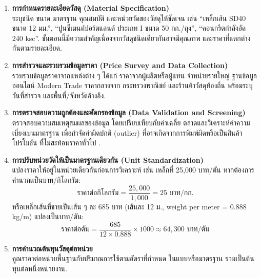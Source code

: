 \begin{enumerate}[leftmargin=2em,itemsep=0.3em]
  \item \textbf{การกำหนดรายละเอียดวัสดุ (Material Specification)}\\
        ระบุชนิด ขนาด มาตรฐาน คุณสมบัติ และหน่วยวัดของวัสดุให้ชัดเจน
        เช่น ``เหล็กเส้น SD40 ขนาด 12 มม.'', ``ปูนซีเมนต์ปอร์ตแลนด์
        ประเภท I ขนาด 50 กก./ถุง'', ``คอนกรีตกำลังอัด 240 ksc''.
        ขั้นตอนนี้มีความสำคัญเนื่องจากวัสดุชนิดเดียวกันอาจมีคุณภาพ
        และราคาที่แตกต่างกันตามรายละเอียด.

  \item \textbf{การสำรวจและรวบรวมข้อมูลราคา (Price Survey and Data Collection)}\\
        รวบรวมข้อมูลราคาจากแหล่งต่าง ๆ ได้แก่ ราคาจากผู้ผลิตหรือผู้แทน
        จำหน่ายรายใหญ่ ฐานข้อมูลออนไลน์ Modern Trade ราคากลางจาก
        กระทรวงพาณิชย์ และร้านค้าวัสดุท้องถิ่น พร้อมระบุวันที่สำรวจ
        และพื้นที่/จังหวัดอ้างอิง.

  \item \textbf{การตรวจสอบความถูกต้องและคัดกรองข้อมูล (Data Validation and Screening)}\\
        ตรวจสอบความสมเหตุสมผลของข้อมูล โดยเปรียบเทียบกับค่าเฉลี่ย
        ตลาดและวิเคราะห์ค่าความเบี่ยงเบนมาตรฐาน เพื่อกำจัดค่าผิดปกติ
        (outlier) ที่อาจเกิดจากการพิมพ์ผิดหรือเป็นสินค้าโปรโมชัน
        ที่ไม่สะท้อนราคาทั่วไป \cite{lee2024}.

  \item \textbf{การปรับหน่วยวัดให้เป็นมาตรฐานเดียวกัน (Unit Standardization)}\\
        แปลงราคาให้อยู่ในหน่วยเดียวกันก่อนการวิเคราะห์ เช่น เหล็กที่
        25{,}000 บาท/ตัน หากต้องการคำนวณเป็นบาท/กิโลกรัม:
        \begin{equation}
          \text{ราคาต่อกิโลกรัม} = \frac{25{,}000}{1{,}000} = 25 \text{ บาท/กก.}
        \end{equation}
        หรือเหล็กเส้นที่ขายเป็นเส้น ๆ ละ 685 บาท (เส้นละ 12 ม.,
        weight per meter = 0.888 kg/m) แปลงเป็นบาท/ตัน:
        \begin{equation}
          \text{ราคาต่อตัน} = \frac{685}{12 \times 0.888} \times 1000 \approx 64{,}300 \text{ บาท/ตัน}
        \end{equation}

  \item \textbf{การคำนวณต้นทุนวัสดุต่อหน่วย}\\
        คูณราคาต่อหน่วยพื้นฐานกับปริมาณการใช้ตามอัตราที่กำหนด
        ในแบบหรือมาตรฐาน รวมเป็นต้นทุนต่อหนึ่งหน่วยงาน.
\end{enumerate}

